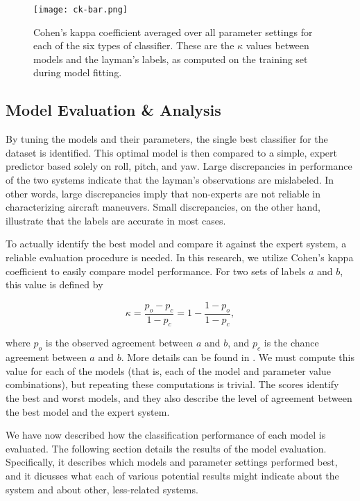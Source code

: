 \documentclass[../main.tex]{subfiles}
\begin{document}

\begin{figure}
    \centerline{\texttt{[image: ck-bar.png]}}
    \caption{Cohen's kappa coefficient averaged over all parameter settings for each of the six types of classifier. These are the $\kappa$ values between models and the layman's labels, as computed on the training set during model fitting.}
    \label{fig:ck-bar}
\end{figure}

\subsection{Model Evaluation \& Analysis}


By tuning the models and their parameters, the single best classifier for the dataset is identified. This optimal model is then compared to a simple, expert predictor based solely on roll, pitch, and yaw. Large discrepancies in performance of the two systems indicate that the layman's observations are mislabeled. In other words, large discrepancies imply that non-experts are not reliable in characterizing aircraft maneuvers. Small discrepancies, on the other hand, illustrate that the labels are accurate in most cases.


To actually identify the best model and compare it against the expert system, a reliable evaluation procedure is needed. In this research, we utilize Cohen's kappa coefficient \cite{Kappa} to easily compare model performance. For two sets of labels $a$ and $b$, this value is defined by

\[ \kappa = \frac{p_o - p_c}{1 - p_c} = 1 - \frac{1 - p_o}{1 - p_c}, \]

\noindent where $p_o$ is the observed agreement between $a$ and $b$, and $p_c$ is the chance agreement between $a$ and $b$. More details can be found in \cite{Kappa}. We must compute this value for each of the models (that is, each of the model and parameter value combinations), but repeating these computations is trivial. The scores identify the best and worst models, and they also describe the level of agreement between the best model and the expert system.


We have now described how the classification performance of each model is evaluated. The following section details the results of the model evaluation. Specifically, it describes which models and parameter settings performed best, and it dicusses what each of various potential results might indicate about the system and about other, less-related systems.
\end{document}
